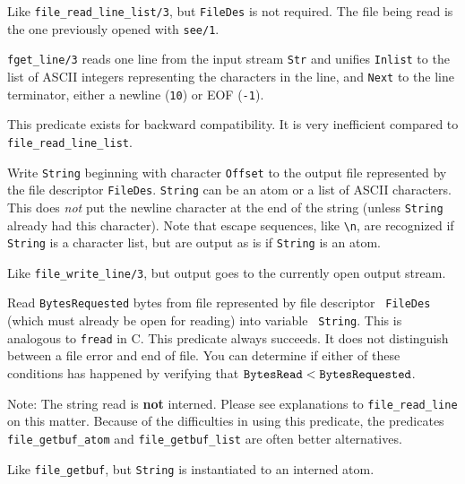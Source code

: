 \begin{description}
   Like \verb|file_read_line_list/3|, but {\tt FileDes} is not required.
   The file being read is the one previously opened with {\tt see/1}.

    {\tt fget\_line/3} reads one line from the input stream {\tt Str} and
    unifies {\tt Inlist} to the list of ASCII integers representing the
    characters in the line, and {\tt Next} to the line terminator, either
    a newline ({\tt 10}) or EOF ({\tt-1}).
    
    This predicate exists for backward compatibility. It is very
    inefficient compared to \verb|file_read_line_list|.

   Write {\tt String} beginning with character {\tt Offset}  to the output
   file represented by the file descriptor {\tt FileDes}. {\tt String} can
   be an atom or a list of ASCII characters. This does \emph{not} put the
   newline character at the end of the string (unless {\tt String} already
   had this character). Note that escape sequences, like \verb|\n|, are
   recognized if {\tt String} is a character list, but are output as is if
   {\tt String} is an atom.
   
   Like \verb|file_write_line/3|, but output goes to the currently open
   output stream.


Read {\tt BytesRequested} bytes from file represented by file descriptor {\tt
  FileDes} (which must already be open for reading) into variable {\tt
  String}. This is analogous to {\tt fread} in C.  This predicate always
succeeds. It does not distinguish between a file error and end of file.
You can determine if either of these conditions has happened by verifying
that $\tt BytesRead < BytesRequested$.

Note: The string read is {\bf not} interned. Please see explanations to
\verb|file_read_line| on this matter. Because of the difficulties in using
this predicate, the predicates \verb|file_getbuf_atom| and
\verb|file_getbuf_list| are often better alternatives.

Like \verb|file_getbuf|, but {\tt String} is instantiated to an interned atom.


\end{description}

